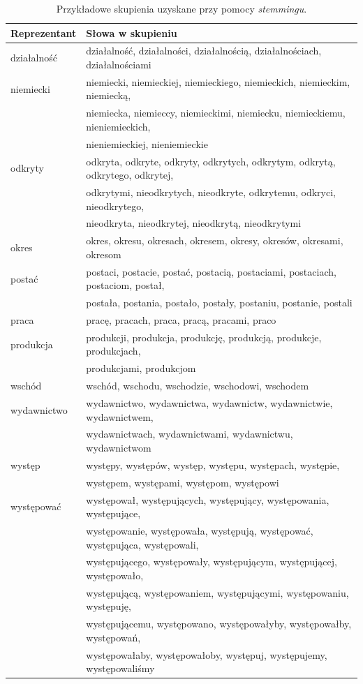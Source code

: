 \documentclass{praca1}
\begin{document}
\begin{table}[!h]
\centering
\caption{Przykładowe skupienia uzyskane przy pomocy \emph{stemmingu}.}
\begin{tabular}{|l|l|}
  \hline
Reprezentant & Słowa w skupieniu \\ \hline
  \hline
działalność & działalność, działalności, działalnością, działalnościach, działalnościami \\ 
   \hline
niemiecki & niemiecki, niemieckiej, niemieckiego, niemieckich, niemieckim, niemiecką, \\ & niemiecka, niemieccy, niemieckimi, niemiecku, niemieckiemu, nieniemieckich, \\ & nieniemieckiej, nieniemieckie \\ 
   \hline
odkryty & odkryta, odkryte, odkryty, odkrytych, odkrytym, odkrytą, odkrytego, odkrytej, \\ & odkrytymi,  nieodkrytych, nieodkryte, odkrytemu, odkryci, nieodkrytego,  \\ & nieodkryta,  nieodkrytej, nieodkrytą, nieodkrytymi \\ 
   \hline
okres & okres, okresu, okresach, okresem, okresy, okresów, okresami, okresom \\ 
   \hline
postać & postaci, postacie, postać, postacią, postaciami, postaciach, postaciom, postał, \\ &  postała, postania, postało, postały, postaniu, postanie, postali \\ 
   \hline
praca & pracę, pracach, praca, pracą, pracami, praco \\ 
   \hline
produkcja & produkcji, produkcja, produkcję, produkcją, produkcje, produkcjach, \\ &  produkcjami, produkcjom \\ 
   \hline
wschód & wschód, wschodu, wschodzie, wschodowi, wschodem \\ 
   \hline
wydawnictwo & wydawnictwo, wydawnictwa, wydawnictw, wydawnictwie, wydawnictwem,\\ &  wydawnictwach, wydawnictwami, wydawnictwu, wydawnictwom \\ 
   \hline
występ & występy, występów, występ, występu, występach, występie, \\ & występem, występami, występom, występowi \\ 
   \hline
występować & występował, występujących, występujący, występowania, występujące, \\ &  występowanie, występowała, występują, występować, występująca, występowali, \\ &  występującego, występowały, występującym, występującej, występowało,\\ &  występującą, występowaniem, występującymi, występowaniu, występuję, \\ & występującemu, występowano, występowałyby, występowałby, występowań, \\ & występowałaby, występowałoby, występuj, występujemy, występowaliśmy \\  
   \hline
\end{tabular}
\label{tab:003}
\end{table}
\end{document}
